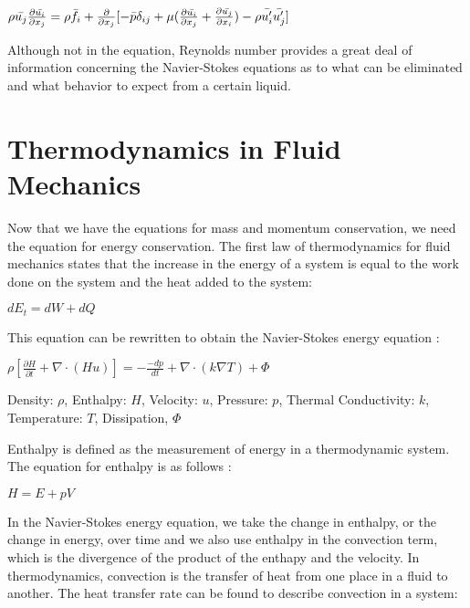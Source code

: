 \documentclass[12pt]{article}
\begin{document}
\begin{center} $ \rho \Bar{u_j}\frac{\partial \Bar{u_i}}{\partial x_j} = \rho \Bar{f_i} + \frac{\partial}{\partial x_j}[-\Bar{p}\delta_{ij} + \mu (\frac{\partial \Bar{u_i}}{\partial x_j}+\frac{\partial \Bar{u_j}}{\partial x_i})-\rho \Bar{u'_i}\Bar{u'_j}]$
\end{center}

Although not in the equation, Reynolds number provides a great deal of information concerning the Navier-Stokes equations as to what can be eliminated and what behavior to expect from a certain liquid.

\section{Thermodynamics in Fluid Mechanics}
Now that we have the equations for mass and momentum conservation, we need the equation for energy conservation. The first law of thermodynamics for fluid mechanics states that the increase in the energy of a system is equal to the work done on the system and the heat added to the system:

\begin{center}$ dE_t = dW + dQ$\end{center}
This equation can be rewritten to obtain the Navier-Stokes energy equation \cite{Energy}:

\begin{center}$ \rho[\frac{\partial H}{\partial t}+ \nabla \cdot (Hu)] = -\frac{-dp}{dt}+\nabla \cdot (k\nabla T)+\Phi$\end{center}
\begin{center}Density: $\rho$, Enthalpy: $H$, Velocity: $u$, Pressure: $p$, Thermal Conductivity: $k$, Temperature: $T$, Dissipation, $\Phi$
\end{center}

Enthalpy is defined as the measurement of energy in a thermodynamic system. The equation for enthalpy is as follows \cite{Enthalpy}:

\begin{center}$H = E + pV$
\end{center}

In the Navier-Stokes energy equation, we take the change in enthalpy, or the change in energy, over time and we also use enthalpy in the convection term, which is the divergence of the product of the enthapy and the velocity. In thermodynamics, convection is the transfer of heat from one place in a fluid to another. The heat transfer rate can be found to describe convection in a system:
\end{document}
